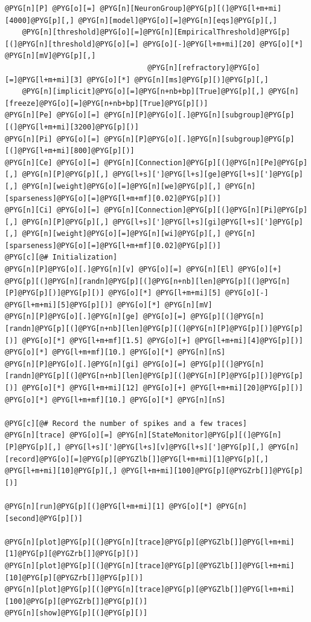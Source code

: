 \documentclass[letterpaper,10pt,english]{manual}
\begin{document}
\begin{Verbatim}[commandchars=@\[\]]
@PYG[n][P] @PYG[o][=] @PYG[n][NeuronGroup]@PYG[p][(]@PYG[l+m+mi][4000]@PYG[p][,] @PYG[n][model]@PYG[o][=]@PYG[n][eqs]@PYG[p][,]
    @PYG[n][threshold]@PYG[o][=]@PYG[n][EmpiricalThreshold]@PYG[p][(]@PYG[n][threshold]@PYG[o][=] @PYG[o][-]@PYG[l+m+mi][20] @PYG[o][*] @PYG[n][mV]@PYG[p][,]
                                 @PYG[n][refractory]@PYG[o][=]@PYG[l+m+mi][3] @PYG[o][*] @PYG[n][ms]@PYG[p][)]@PYG[p][,]
    @PYG[n][implicit]@PYG[o][=]@PYG[n+nb+bp][True]@PYG[p][,] @PYG[n][freeze]@PYG[o][=]@PYG[n+nb+bp][True]@PYG[p][)]
@PYG[n][Pe] @PYG[o][=] @PYG[n][P]@PYG[o][.]@PYG[n][subgroup]@PYG[p][(]@PYG[l+m+mi][3200]@PYG[p][)]
@PYG[n][Pi] @PYG[o][=] @PYG[n][P]@PYG[o][.]@PYG[n][subgroup]@PYG[p][(]@PYG[l+m+mi][800]@PYG[p][)]
@PYG[n][Ce] @PYG[o][=] @PYG[n][Connection]@PYG[p][(]@PYG[n][Pe]@PYG[p][,] @PYG[n][P]@PYG[p][,] @PYG[l+s][']@PYG[l+s][ge]@PYG[l+s][']@PYG[p][,] @PYG[n][weight]@PYG[o][=]@PYG[n][we]@PYG[p][,] @PYG[n][sparseness]@PYG[o][=]@PYG[l+m+mf][0.02]@PYG[p][)]
@PYG[n][Ci] @PYG[o][=] @PYG[n][Connection]@PYG[p][(]@PYG[n][Pi]@PYG[p][,] @PYG[n][P]@PYG[p][,] @PYG[l+s][']@PYG[l+s][gi]@PYG[l+s][']@PYG[p][,] @PYG[n][weight]@PYG[o][=]@PYG[n][wi]@PYG[p][,] @PYG[n][sparseness]@PYG[o][=]@PYG[l+m+mf][0.02]@PYG[p][)]
@PYG[c][@# Initialization]
@PYG[n][P]@PYG[o][.]@PYG[n][v] @PYG[o][=] @PYG[n][El] @PYG[o][+] @PYG[p][(]@PYG[n][randn]@PYG[p][(]@PYG[n+nb][len]@PYG[p][(]@PYG[n][P]@PYG[p][)]@PYG[p][)] @PYG[o][*] @PYG[l+m+mi][5] @PYG[o][-] @PYG[l+m+mi][5]@PYG[p][)] @PYG[o][*] @PYG[n][mV]
@PYG[n][P]@PYG[o][.]@PYG[n][ge] @PYG[o][=] @PYG[p][(]@PYG[n][randn]@PYG[p][(]@PYG[n+nb][len]@PYG[p][(]@PYG[n][P]@PYG[p][)]@PYG[p][)] @PYG[o][*] @PYG[l+m+mf][1.5] @PYG[o][+] @PYG[l+m+mi][4]@PYG[p][)] @PYG[o][*] @PYG[l+m+mf][10.] @PYG[o][*] @PYG[n][nS]
@PYG[n][P]@PYG[o][.]@PYG[n][gi] @PYG[o][=] @PYG[p][(]@PYG[n][randn]@PYG[p][(]@PYG[n+nb][len]@PYG[p][(]@PYG[n][P]@PYG[p][)]@PYG[p][)] @PYG[o][*] @PYG[l+m+mi][12] @PYG[o][+] @PYG[l+m+mi][20]@PYG[p][)] @PYG[o][*] @PYG[l+m+mf][10.] @PYG[o][*] @PYG[n][nS]

@PYG[c][@# Record the number of spikes and a few traces]
@PYG[n][trace] @PYG[o][=] @PYG[n][StateMonitor]@PYG[p][(]@PYG[n][P]@PYG[p][,] @PYG[l+s][']@PYG[l+s][v]@PYG[l+s][']@PYG[p][,] @PYG[n][record]@PYG[o][=]@PYG[p][@PYGZlb[]]@PYG[l+m+mi][1]@PYG[p][,] @PYG[l+m+mi][10]@PYG[p][,] @PYG[l+m+mi][100]@PYG[p][@PYGZrb[]]@PYG[p][)]

@PYG[n][run]@PYG[p][(]@PYG[l+m+mi][1] @PYG[o][*] @PYG[n][second]@PYG[p][)]

@PYG[n][plot]@PYG[p][(]@PYG[n][trace]@PYG[p][@PYGZlb[]]@PYG[l+m+mi][1]@PYG[p][@PYGZrb[]]@PYG[p][)]
@PYG[n][plot]@PYG[p][(]@PYG[n][trace]@PYG[p][@PYGZlb[]]@PYG[l+m+mi][10]@PYG[p][@PYGZrb[]]@PYG[p][)]
@PYG[n][plot]@PYG[p][(]@PYG[n][trace]@PYG[p][@PYGZlb[]]@PYG[l+m+mi][100]@PYG[p][@PYGZrb[]]@PYG[p][)]
@PYG[n][show]@PYG[p][(]@PYG[p][)]
\end{Verbatim}
\end{document}
